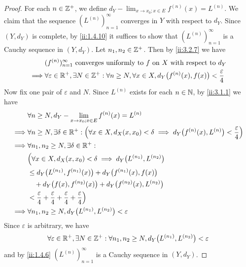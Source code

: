 \begin{proof}
  For each \(n \in \mathbb{Z}^+\), we define \(d_Y - \lim_{x \to x_0 ; x \in E} f^{(n)}(x) = L^{(n)}\).
  We claim that the sequence \((L^{(n)})_{n = 1}^\infty\) converges in \(Y\) with respect to \(d_Y\).
  Since \((Y, d_Y)\) is complete, by \cref{ii:1.4.10} it suffices to show that \((L^{(n)})_{n = 1}^\infty\) is a Cauchy sequence in \((Y, d_Y)\).
  Let \(n_1, n_2 \in \mathbb{Z}^+\).
  Then by \cref{ii:3.2.7} we have
  \begin{align*}
             & (f^{(n)})_{n = 1}^\infty \text{ converges uniformly to } f \text{ on } X \text{ with respect to } d_Y                                        \\
    \implies & \forall \varepsilon \in \mathbb{R}^+, \exists N \in \mathbb{Z}^+ : \forall n \geq N, \forall x \in X, d_Y\big(f^{(n)}(x), f(x)\big) < \dfrac{\varepsilon}{4}
  \end{align*}
  Now fix one pair of \(\varepsilon\) and \(N\).
  Since \(L^{(n)}\) exists for each \(n \in \mathbb{N}\), by \cref{ii:3.1.1} we have
  \begin{align*}
             & \forall n \geq N, d_Y - \lim_{x \to x_0 ; x \in E} f^{(n)}(x) = L^{(n)}                                                                                        \\
    \implies & \forall n \geq N, \exists \delta \in \mathbb{R}^+ : \Big(\forall x \in X, d_X(x, x_0) < \delta \implies d_Y\big(f^{(n)}(x), L^{(n)}\big) < \dfrac{\varepsilon}{4}\Big) \\
    \implies & \forall n_1, n_2 \geq N, \exists \delta \in \mathbb{R}^+ :                                                                                                             \\
             & \Big(\forall x \in X, d_X(x, x_0) < \delta \implies d_Y\big(L^{(n_1)}, L^{(n_2)}\big)                                                                          \\
             & \leq d_Y\big(L^{(n_1)}, f^{(n_1)}(x)\big) + d_Y\big(f^{(n_1)}(x), f(x)\big)                                                                                    \\
             & \quad + d_Y\big(f(x), f^{(n_2)}(x)\big) + d_Y\big(f^{(n_2)}(x), L^{(n_2)}\big)                                                                                 \\
             & < \dfrac{\varepsilon}{4} + \dfrac{\varepsilon}{4} + \dfrac{\varepsilon}{4} + \dfrac{\varepsilon}{4}\Big)                                                       \\
    \implies & \forall n_1, n_2 \geq N, d_Y\big(L^{(n_1)}, L^{(n_2)}\big) < \varepsilon
  \end{align*}
  Since \(\varepsilon\) is arbitrary, we have
  \[
    \forall \varepsilon \in \mathbb{R}^+, \exists N \in \mathbb{Z}^+ : \forall n_1, n_2 \geq N, d_Y\big(L^{(n_1)}, L^{(n_2)}\big) < \varepsilon
  \]
  and by \cref{ii:1.4.6} \((L^{(n)})_{n = 1}^\infty\) is a Cauchy sequence in \((Y, d_Y)\).


\end{proof}

